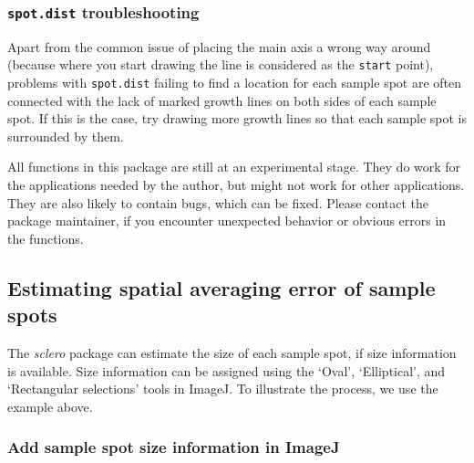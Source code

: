\documentclass[11pt, a4paper]{article}
\newcommand{\sclero}{\textit{sclero}\xspace}
\begin{document}
\subsubsection{\texttt{spot.dist} troubleshooting}

Apart from the common issue of placing the main axis a wrong way around (because where you start drawing the line is considered as the \texttt{start} point), problems with \texttt{spot.dist} failing to find a location for each sample spot are often connected with the lack of marked growth lines on both sides of each sample spot. If this is the case, try drawing more growth lines so that each sample spot is surrounded by them. %

All functions in this package are still at an experimental stage. They do work for the applications needed by the author, but might not work for other applications. They are also likely to contain bugs, which can be fixed. Please contact the package maintainer, if you encounter unexpected behavior or obvious errors in the functions.

\clearpage
\subsection{Estimating spatial averaging error of sample spots} \label{sec:averaging_error}

The \sclero package can estimate the size of each sample spot, if size information is available. Size information can be assigned using the `Oval', `Elliptical', and `Rectangular selections' tools in ImageJ. To illustrate the process, we use the example above.

\subsubsection{Add sample spot size information in ImageJ}
\end{document}

